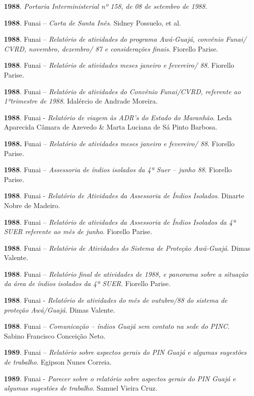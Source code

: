\textbf{1988}. \emph{Portaria Interministerial nº 158, de 08 de setembro
de 1988}.

\textbf{1988}. Funai -- \emph{Carta de Santa Inês}. Sidney Possuelo, et
al.

\textbf{1988}. Funai -- \emph{Relatório de atividades do programa
Awá-Guajá, convênio Funai/ CVRD, novembro, dezembro/ 87 e considerações
finais}. Fiorello Parise.

\textbf{1988}. Funai -- \emph{Relatório de atividades meses janeiro e
fevereiro/ 88}. Fiorello Parise.

\textbf{1988}. Funai -- \emph{Relatório de atividades do Convênio
Funai/CVRD, referente ao 1ºtrimestre de 1988}. Idalércio de Andrade
Moreira.

\textbf{1988}. Funai - \emph{Relatório de viagem às ADR's do Estado do
Maranhão}. Leda Aparecida Câmara de Azevedo \& Marta Luciana de Sá Pinto
Barbosa.

\textbf{1988.} Funai -- \emph{Relatório de atividades meses janeiro e
fevereiro/ 88}. Fiorello Parise.

\textbf{1988}. Funai -- \emph{Assessoria de índios isolados da 4ª Suer
-- junho 88}. Fiorello Parise.

\textbf{1988}. Funai - \emph{Relatório de Atividades da Assessoria de
Índios Isolados}. Dinarte Nobre de Madeiro.

\textbf{1988}. Funai -- \emph{Relatório de atividades da Assessoria de
Índios Isolados da 4ª SUER referente ao mês de junho}. Fiorello Parise.

\textbf{1988}. Funai -- \emph{Relatório de Atividades do Sistema de
Proteção Awá-Guajá}. Dimas Valente.

\textbf{1988}. Funai -- \emph{Relatório final de atividades de 1988, e
panorama sobre a situação da área de índios isolados da 4ª SUER}.
Fiorello Parise.

\textbf{1988}. Funai - \emph{Relatório} \emph{de atividades do mês de
outubro/88 do sistema de proteção Awá/Guajá}. Dimas Valente.

\textbf{1988}. Funai -- \emph{Comunicação -- índios Guajá sem contato na
sede do PINC}. Sabino Francisco Conceição Neto.

\textbf{1989}. Funai -- \emph{Relatório sobre aspectos gerais do PIN
Guajá e algumas sugestões de trabalho}. Egipson Nunes Correia.

\textbf{1989}. Funai - \emph{Parecer sobre o relatório sobre aspectos
gerais do PIN Guajá e algumas sugestões de trabalho}. Samuel Vieira
Cruz.

